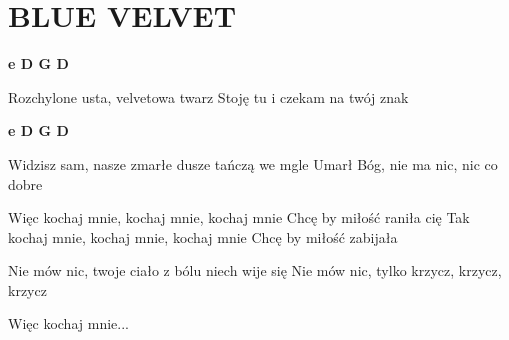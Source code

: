 \documentclass[../../../songbook.tex]{subfiles}
\begin{document}
\TabPositions{9cm} %
\section*{BLUE VELVET}
{}
\vspace{0.5cm}
{\color{red}\textbf{e D G D} } \newline

Rozchylone usta, velvetowa twarz		  \newline
Stoję tu i czekam na twój znak \newline

{\color{red}\textbf{e D G D} } \newline

Widzisz sam, nasze zmarłe dusze tańczą we mgle \newline
Umarł Bóg, nie ma nic, nic co dobre \newline
                                                      
\-\hspace{1cm} Więc kochaj mnie, kochaj mnie, kochaj mnie	 \newline
\-\hspace{1cm} Chcę by miłość raniła cię					 \newline
\-\hspace{1cm} Tak kochaj mnie, kochaj mnie, kochaj mnie \newline
\-\hspace{1cm} Chcę by miłość zabijała \newline

Nie mów nic, twoje ciało z bólu niech wije się \newline
Nie mów nic, tylko krzycz, krzycz, krzycz \newline

\-\hspace{1cm} Więc kochaj mnie...
\end{document}
